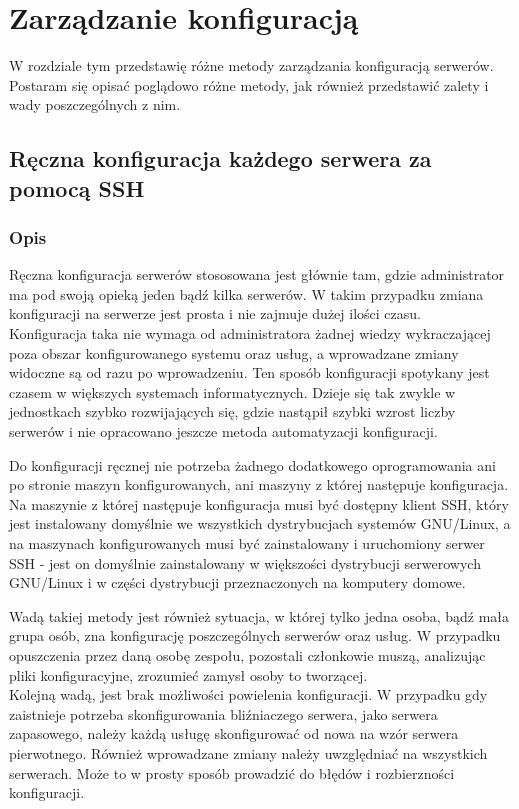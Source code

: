 \chapter{Zarządzanie konfiguracją}
W rozdziale tym przedstawię różne metody zarządzania konfiguracją serwerów. Postaram się opisać poglądowo różne metody, jak również przedstawić zalety i wady poszczególnych z nim.
\section{Ręczna konfiguracja każdego serwera za pomocą SSH}
\subsection{Opis}
Ręczna konfiguracja serwerów stososowana jest głównie tam, gdzie administrator ma pod swoją opieką jeden bądź kilka serwerów. W takim przypadku zmiana konfiguracji na serwerze jest prosta i nie zajmuje dużej ilości czasu.\\
Konfiguracja taka nie wymaga od administratora żadnej wiedzy wykraczającej poza obszar konfigurowanego systemu oraz usług, a wprowadzane zmiany widoczne są od razu po wprowadzeniu.
Ten sposób konfiguracji spotykany jest czasem w większych systemach informatycznych.
Dzieje się tak zwykle w jednostkach szybko rozwijających się, gdzie nastąpił szybki wzrost liczby serwerów i nie opracowano jeszcze metoda automatyzacji konfiguracji.

Do konfiguracji ręcznej nie potrzeba żadnego dodatkowego oprogramowania ani po stronie maszyn konfigurowanych, ani maszyny z której następuje konfiguracja.
Na maszynie z której następuje konfiguracja musi być dostępny klient SSH, który jest instalowany domyślnie we wszystkich dystrybucjach systemów GNU/Linux, a na maszynach konfigurowanych musi być zainstalowany i uruchomiony serwer SSH - jest on domyślnie zainstalowany w większości dystrybucji serwerowych GNU/Linux i w części dystrybucji przeznaczonych na komputery domowe.

Wadą takiej metody jest również sytuacja, w której tylko jedna osoba, bądź mała grupa osób, zna konfigurację poszczególnych serwerów oraz usług.
W przypadku opuszczenia przez daną osobę zespołu, pozostali członkowie muszą, analizując pliki konfiguracyjne, zrozumieć zamysł osoby to tworzącej.\\
Kolejną wadą, jest brak możliwości powielenia konfiguracji.
W przypadku gdy zaistnieje potrzeba skonfigurowania bliźniaczego serwera, jako serwera zapasowego, należy każdą usługę skonfigurować od nowa na wzór serwera pierwotnego. Również wprowadzane zmiany należy uwzględniać na wszystkich serwerach.
Może to w prosty sposób prowadzić do błędów i rozbierzności konfiguracji.
